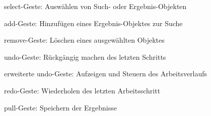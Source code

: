 \documentclass{sigchi-ext}
\begin{document}
select-Geste: Auswählen von Such- oder Ergebnis-Objekten

add-Geste: Hinzufügen eines Ergebnis-Objektes zur Suche

remove-Geste: Löschen eines ausgewählten Objektes

undo-Geste: Rückgängig machen des letzten Schritts

erweiterte undo-Geste: Aufzeigen und Steuern des Arbeitsverlaufs 

redo-Geste: Wiederholen des letzten Arbeitsschritt

pull-Geste: Speichern der Ergebnisse



\balance{} 




\end{document}
